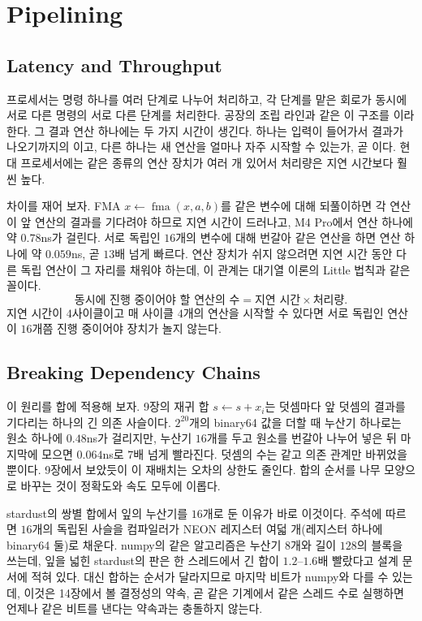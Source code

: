 \section{Pipelining}
\label{sec:pipeline}

\subsection{Latency and Throughput}

프로세서는 명령 하나를 여러 단계로 나누어 처리하고, 각 단계를 맡은 회로가 동시에 서로 다른 명령의 서로 다른 단계를 처리한다. 공장의 조립 라인과 같은 이 구조를 이라 한다. 그 결과 연산 하나에는 두 가지 시간이 생긴다. 하나는 입력이 들어가서 결과가 나오기까지의 이고, 다른 하나는 새 연산을 얼마나 자주 시작할 수 있는가, 곧 이다. 현대 프로세서에는 같은 종류의 연산 장치가 여러 개 있어서 처리량은 지연 시간보다 훨씬 높다.

차이를 재어 보자. FMA $x\gets\operatorname{fma}(x,a,b)$를 같은 변수에 대해 되풀이하면 각 연산이 앞 연산의 결과를 기다려야 하므로 지연 시간이 드러나고, M4 Pro에서 연산 하나에 약 $0.78$ns가 걸린다. 서로 독립인 $16$개의 변수에 대해 번갈아 같은 연산을 하면 연산 하나에 약 $0.059$ns, 곧 $13$배 넘게 빠르다. 연산 장치가 쉬지 않으려면 지연 시간 동안 다른 독립 연산이 그 자리를 채워야 하는데, 이 관계는 대기열 이론의 Little 법칙\cite{little1961}과 같은 꼴이다.
\[
\text{동시에 진행 중이어야 할 연산의 수}=\text{지연 시간}\times\text{처리량}.
\]
지연 시간이 $4$사이클이고 매 사이클 $4$개의 연산을 시작할 수 있다면 서로 독립인 연산이 $16$개쯤 진행 중이어야 장치가 놀지 않는다.

\subsection{Breaking Dependency Chains}

이 원리를 합에 적용해 보자. 9장의 재귀 합 $s\gets s+x_i$는 덧셈마다 앞 덧셈의 결과를 기다리는 하나의 긴 의존 사슬이다. $2^{20}$개의 binary64 값을 더할 때 누산기 하나로는 원소 하나에 $0.48$ns가 걸리지만, 누산기 $16$개를 두고 원소를 번갈아 나누어 넣은 뒤 마지막에 모으면 $0.064$ns로 $7$배 넘게 빨라진다. 덧셈의 수는 같고 의존 관계만 바뀌었을 뿐이다. 9장에서 보았듯이 이 재배치는 오차의 상한도 줄인다. 합의 순서를 나무 모양으로 바꾸는 것이 정확도와 속도 모두에 이롭다.

\begin{instardust}
stardust의 쌍별 합에서 잎의 누산기를 $16$개로 둔 이유가 바로 이것이다. 주석에 따르면 $16$개의 독립된 사슬을 컴파일러가 NEON 레지스터 여덟 개(레지스터 하나에 binary64 둘)로 채운다. numpy의 같은 알고리즘은 누산기 $8$개와 길이 $128$의 블록을 쓰는데, 잎을 넓힌 stardust의 판은 한 스레드에서 긴 합이 $1.2$--$1.6$배 빨랐다고 설계 문서에 적혀 있다. 대신 합하는 순서가 달라지므로 마지막 비트가 numpy와 다를 수 있는데, 이것은 14장에서 볼 결정성의 약속, 곧 같은 기계에서 같은 스레드 수로 실행하면 언제나 같은 비트를 낸다는 약속과는 충돌하지 않는다.
\end{instardust}

